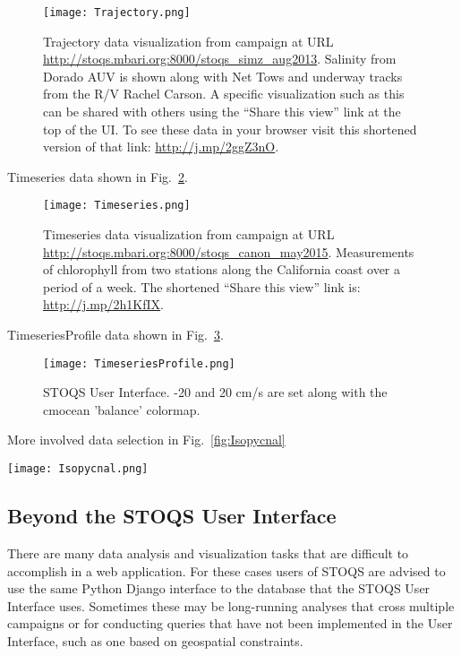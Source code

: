 \documentclass[conference]{IEEEtran}
\begin{document}
\begin{figure}[htbp]
\centering
\texttt{[image: Trajectory.png]}
\caption{Trajectory data visualization from campaign at URL \url{http://stoqs.mbari.org:8000/stoqs_simz_aug2013}.
Salinity from Dorado AUV is shown along with Net Tows and underway tracks from the R/V Rachel Carson.
A specific visualization such as this can be shared with others using the ``Share this view'' link at the
top of the UI. To see these data in your browser visit this shortened version of that link: \url{http://j.mp/2ggZ3nO}.}
\label{fig:Trajectory}
\end{figure}

Timeseries data shown in Fig.~\ref{fig:Timeseries}.

\begin{figure}[htbp]
\centering
\texttt{[image: Timeseries.png]}
\caption{Timeseries data visualization from campaign at URL \url{http://stoqs.mbari.org:8000/stoqs_canon_may2015}.
Measurements of chlorophyll from two stations along the California coast over a period of a week.
The shortened ``Share this view'' link is: \url{http://j.mp/2h1KfIX}.}
\label{fig:Timeseries}
\end{figure}

TimeseriesProfile data shown in Fig.~\ref{fig:TimeseriesProfile}.

\begin{figure}[htbp]
\centering
\texttt{[image: TimeseriesProfile.png]}
\caption{STOQS User Interface. -20 and 20 cm/s are set along with the cmocean 'balance' colormap.}
\label{fig:TimeseriesProfile}
\end{figure}

More involved data selection in Fig.~\ref{fig:Isopycnal}

\begin{figure*}[htbp]
\centering
\texttt{[image: Isopycnal.png]}
\caption{Chlorophyll fluoresence measurement selected for plotting on isopycnal level between 25.0 and 25.25.}
\label{fig:Isopycnal}
\end{figure*}




\subsection{Beyond the STOQS User Interface}

There are many data analysis and visualization tasks that are difficult to
accomplish in a web application. For these cases users of STOQS are advised to 
use the same Python Django interface to the database that the STOQS User
Interface uses. Sometimes these may be long-running analyses that cross
multiple campaigns or for conducting queries that have not been implemented
in the User Interface, such as one based on geospatial constraints.
\end{document}
